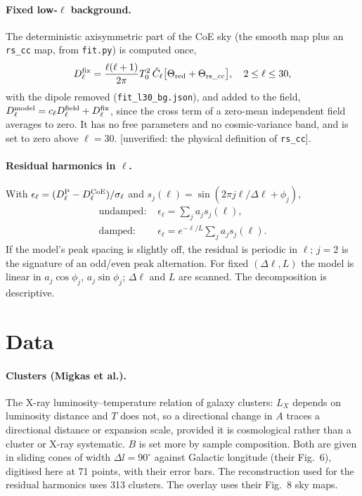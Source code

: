 \documentclass[10pt,twocolumn]{article}
\newcommand{\flag}[1]{\textsf{[unverified: #1]}}
\begin{document}
\paragraph{Fixed low-$\ell$ background.} The deterministic axisymmetric part of the CoE sky (the smooth map plus an \texttt{rs\_cc} map, from \texttt{fit.py}) is computed once,
\begin{equation}
D^{\rm fix}_\ell=\frac{\ell(\ell+1)}{2\pi}T_0^2\,\hat C_\ell\big[\Theta_{\rm red}+\Theta_{\rm rs\_cc}\big],\quad 2\le\ell\le30,
\end{equation}
with the dipole removed (\texttt{fit\_l30\_bg.json}), and added to the field, $D^{\rm model}_\ell=c_\ell D^{\rm field}_\ell+D^{\rm fix}_\ell$, since the cross term of a zero-mean independent field averages to zero. It has no free parameters and no cosmic-variance band, and is set to zero above $\ell=30$. \flag{the physical definition of \texttt{rs\_cc}}.

\paragraph{Residual harmonics in $\ell$.} With $\epsilon_\ell=(D^{\rm P}_\ell-D^{\rm CoE}_\ell)/\sigma_\ell$ and $s_j(\ell)=\sin(2\pi j\ell/\Delta\ell+\phi_j)$,
\begin{align}
\text{undamped: }&\epsilon_\ell=\textstyle\sum_ja_js_j(\ell),\\
\text{damped: }&\epsilon_\ell=e^{-\ell/L}\textstyle\sum_ja_js_j(\ell).
\end{align}
If the model's peak spacing is slightly off, the residual is periodic in $\ell$; $j=2$ is the signature of an odd/even peak alternation. For fixed $(\Delta\ell,L)$ the model is linear in $a_j\cos\phi_j$, $a_j\sin\phi_j$; $\Delta\ell$ and $L$ are scanned. The decomposition is descriptive.

\section{Data}\label{sec:data}
\paragraph{Clusters (Migkas et al.).} The X-ray luminosity--temperature relation of galaxy clusters: $L_X$ depends on luminosity distance and $T$ does not, so a directional change in $A$ traces a directional distance or expansion scale, provided it is cosmological rather than a cluster or X-ray systematic. $B$ is set more by sample composition. Both are given in sliding cones of width $\Delta l=90^\circ$ against Galactic longitude (their Fig.~6), digitised here at 71 points, with their error bars. The reconstruction used for the residual harmonics uses 313 clusters. The overlay uses their Fig.~8 sky maps.
\end{document}
